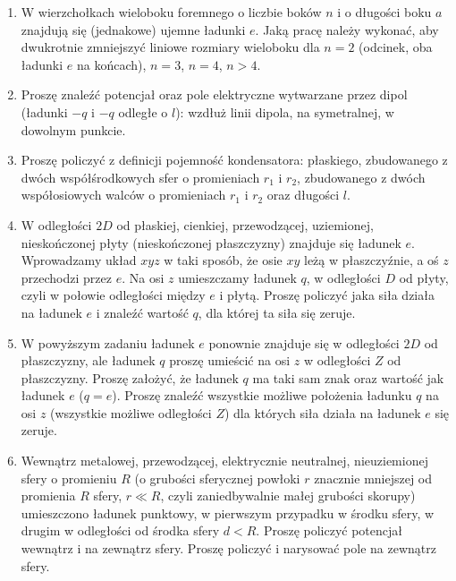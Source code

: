 \documentclass[a4paper,11pt]{article}
\begin{document}
\begin{enumerate}

\item W wierzchołkach wieloboku foremnego o liczbie boków $n$ i o
  długości boku $a$ znajdują się (jednakowe) ujemne ładunki $e$. Jaką
  pracę należy wykonać, aby dwukrotnie zmniejszyć liniowe rozmiary
  wieloboku dla $n = 2$ (odcinek, oba ładunki $e$ na końcach),
  $n = 3$, $n = 4$, $n > 4$.



\item Proszę znaleźć potencjał oraz pole elektryczne wytwarzane przez
  dipol (ładunki $-q$ i $-q$ odległe o $l$): wzdłuż linii dipola, na
  symetralnej, w dowolnym punkcie.



\item Proszę policzyć z definicji pojemność kondensatora: płaskiego,
  zbudowanego z dwóch współśrodkowych sfer o promieniach $r_{ 1 }$ i
  $r_{ 2 }$, zbudowanego z dwóch współosiowych walców o promieniach
  $r_{ 1 }$ i $r_{ 2 }$ oraz długości $l$.



\item W odległości $2D$ od płaskiej, cienkiej, przewodzącej,
  uziemionej, nieskończonej płyty (nieskończonej płaszczyzny) znajduje
  się ładunek $e$. Wprowadzamy układ $xyz$ w taki sposób, że osie $xy$
  leżą w płaszczyźnie, a oś $z$ przechodzi przez $e$. Na osi $z$
  umieszczamy ładunek $q$, w odległości $D$ od płyty, czyli w połowie
  odległości między $e$ i płytą. Proszę policzyć jaka siła działa na
  ładunek $e$ i znaleźć wartość $q$, dla której ta siła się zeruje.



\item W powyższym zadaniu ładunek $e$ ponownie znajduje się w
  odległości $2D$ od płaszczyzny, ale ładunek $q$ proszę umieścić na
  osi $z$ w odległości $Z$ od płaszczyzny. Proszę założyć, że ładunek
  $q$ ma taki sam znak oraz wartość jak ładunek $e$ ($q = e$). Proszę
  znaleźć wszystkie możliwe położenia ładunku $q$ na osi $z$
  (wszystkie możliwe odległości $Z$) dla których siła działa na
  ładunek $e$ się zeruje.



\item Wewnątrz metalowej, przewodzącej, elektrycznie neutralnej,
  nieuziemionej sfery o promieniu $R$ (o grubości sferycznej powłoki
  $r$ znacznie mniejszej od promienia $R$ sfery, $r \ll R$, czyli
  zaniedbywalnie małej grubości skorupy) umieszczono ładunek punktowy,
  w pierwszym przypadku w środku sfery, w drugim w odległości od
  środka sfery $d < R$. Proszę policzyć potencjał wewnątrz i na
  zewnątrz sfery. Proszę policzyć i narysować pole na zewnątrz sfery.




\end{enumerate}
\end{document}
